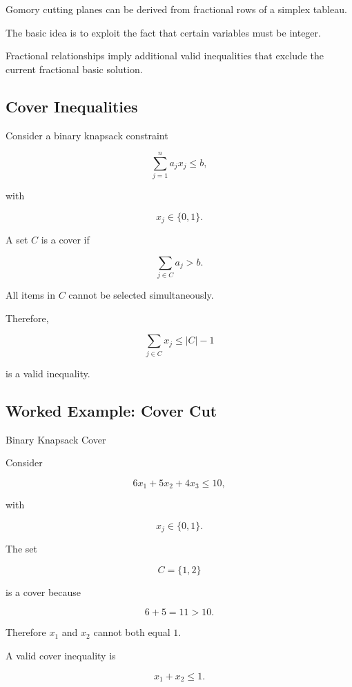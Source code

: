 Gomory cutting planes can be derived from fractional rows of a simplex
tableau.

The basic idea is to exploit the fact that certain variables must be
integer.

Fractional relationships imply additional valid inequalities that exclude
the current fractional basic solution.

\subsection{Cover Inequalities}
\label{subsec:cover-inequalities}

Consider a binary knapsack constraint

\[
\boxed{
\sum_{j=1}^{n}
a_jx_j
\leq
b,
}
\]

with

\[
x_j\in\{0,1\}.
\]

A set \(C\) is a cover if

\[
\boxed{
\sum_{j\in C}
a_j
>
b.
}
\]

All items in \(C\) cannot be selected simultaneously.

Therefore,

\[
\boxed{
\sum_{j\in C}
x_j
\leq
|C|-1
}
\]

is a valid inequality.

\subsection{Worked Example: Cover Cut}
\label{subsec:worked-cover-cut}

\begin{workedexamplebox}{Binary Knapsack Cover}

Consider

\[
6x_1+5x_2+4x_3\leq10,
\]

with

\[
x_j\in\{0,1\}.
\]

The set

\[
C=\{1,2\}
\]

is a cover because

\[
6+5=11>10.
\]

Therefore \(x_1\) and \(x_2\) cannot both equal \(1\).

A valid cover inequality is

\begin{answerbox}
\[
\boxed{
x_1+x_2\leq1.
}
\]
\end{answerbox}

\end{workedexamplebox}

